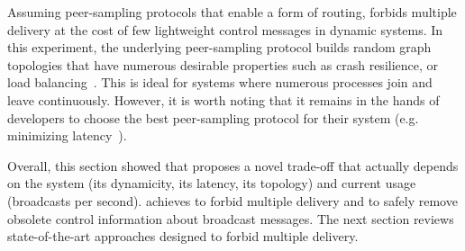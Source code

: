 
\noindent Assuming peer-sampling protocols that enable a form of routing,
\RPCBROADCAST forbids multiple delivery at the cost of few lightweight control
messages in dynamic systems. In this experiment, the underlying peer-sampling
protocol builds random graph topologies that have numerous desirable properties
such as crash resilience, or load balancing~\cite{jelasity2007gossip}. This is
ideal for systems where numerous processes join and leave continuously. However,
it is worth noting that it remains in the hands of developers to choose the best
peer-sampling protocol for their system (e.g. minimizing
latency~\cite{dabek2004vivaldi}).


Overall, this section showed that \RPCBROADCAST proposes a novel trade-off
that actually depends on the system (its dynamicity, its latency, its topology)
and current usage (broadcasts per second).  \RPCBROADCAST achieves to forbid
multiple delivery and to safely remove obsolete control information about
broadcast messages. The next section reviews state-of-the-art approaches
designed to forbid multiple delivery.




